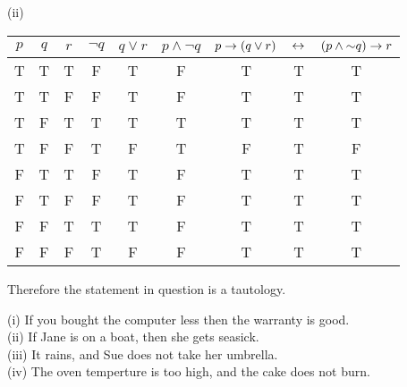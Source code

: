 \documentclass{report}
\begin{document}
\sol (ii)
\begin{center}
	\begin{tabular}{|ccc||c||cc||ccc||}
		\hline
			$p$ &$q$ &$r$ &$\lnot q$ &$q\lor r$ &$p\land\lnot q$ &$p\rightarrow(q\lor r)$& $\leftrightarrow$ &$(p\land\mathord{\sim} q)\rightarrow r$ \\ \hline
			T & T & T & F & T & F & T & T  & T \\
			T & T & F & F & T & F & T & T  & T \\
			T & F & T & T & T & T & T & T  & T \\
			T & F & F & T & F & T & F & T  & F \\
			F & T & T & F & T & F & T & T  & T \\
			F & T & F & F & T & F & T & T  & T \\
			F & F & T & T & T & F & T & T  & T \\
			F & F & F & T & F & F & T & T  & T \\ \hline 
	\end{tabular}
\end{center}
Therefore the statement in question is a tautology.

\sol (i) If you bought the computer less then the warranty is good. \\

\sol (ii) If Jane is on a boat, then she gets seasick. \\

\sol (iii) It rains, and Sue does not take her umbrella. \\

\sol (iv) The oven temperture is too high, and the cake does not burn.
\end{document}
